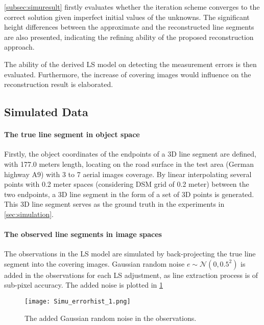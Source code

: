 \cref{subsec:simuresult} firstly evaluates whether the iteration scheme converges to the correct solution given imperfect initial values of the unknowns. The significant height differences between the approximate and the reconstructed line segments are also presented, indicating the refining ability of the proposed reconstruction approach.

The ability of the derived LS model on detecting the measurement errors is then evaluated. Furthermore, the increase of covering images would influence on the reconstruction result is elaborated.





\subsection{Simulated Data}
\label{subsec:simudata}

\paragraph{The true line segment in object space}
Firstly, the object coordinates of the endpoints of a 3D line segment are defined, with 177.0 meters length, locating on the road surface in the test area (German highway A9) with 3 to 7 aerial images coverage. By linear interpolating several points with 0.2 meter spaces (considering DSM grid of 0.2 meter) between the two endpoints, a 3D line segment in the form of a set of 3D points is generated. This 3D line segment serves as the ground truth in the experiments in \cref{sec:simulation}. 

\paragraph{The observed line segments in image spaces}
The observations in the LS model are simulated by back-projecting the true line segment into the covering images. Gaussian random noise $e\sim\mathcal{N}(0,0.5^2)$ is added in the observations for each LS adjustment, as line extraction process is of sub-pixel accuracy. The added noise is plotted in \cref{fig:noise}

\begin{figure}
  \centering
  \texttt{[image: Simu\_errorhist\_1.png]}
  \caption{\small The added Gaussian random noise in the observations.}
  \label{fig:noise}
\end{figure}

